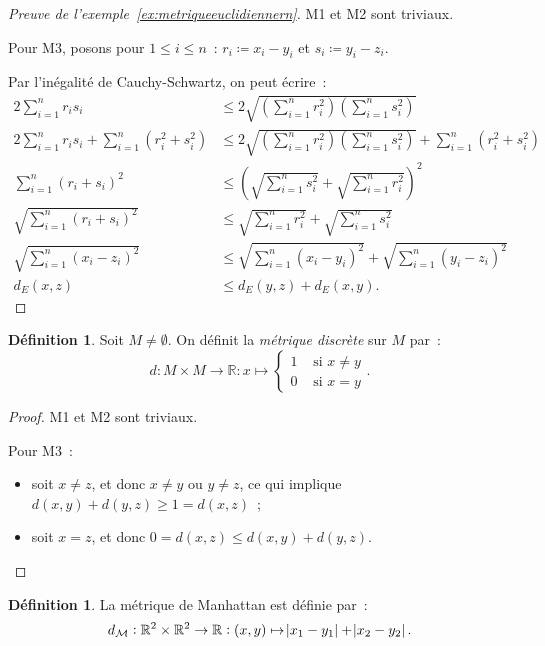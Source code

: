 \documentclass{report}
\theoremstyle{definition}
\newtheorem{déf}[thm]{Définition}
\theoremstyle{remark}
\newcommand{\R}{\mathbb R}
\begin{document}
		\begin{proof}[Preuve de l'exemple~\ref{ex:metriqueeuclidiennern}] M1 et M2 sont triviaux.

		Pour M3, posons pour $1 \leq i \leq n$~: $r_i \coloneqq x_i - y_i$ et $s_i \coloneqq y_i - z_i$.

		Par l'inégalité de Cauchy-Schwartz, on peut écrire~:
		\begin{align*}
			2\sum_{i=1}^nr_is_i &\leq 2\sqrt {\left(\sum_{i=1}^nr_i^2\right)\left(\sum_{i=1}^ns_i^2\right)} \\
			2\sum_{i=1}^nr_is_i + \sum_{i=1}^n(r_i^2+s_i^2) &\leq 2\sqrt{\left(\sum_{i=1}^nr_i^2\right)\left(\sum_{i=1}^ns_i^2\right)} + \sum_{i=1}^n(r_i^2+s_i^2) \\
			\sum_{i=1}^n(r_i+s_i)^2 &\leq \left(\sqrt {\sum_{i=1}^ns_i^2} + \sqrt {\sum_{i=1}^nr_i^2}\right)^2 \\
			\sqrt {\sum_{i=1}^n(r_i+s_i)^2} &\leq \sqrt {\sum_{i=1}^nr_i^2} + \sqrt {\sum_{i=1}^ns_i^2} \\
			\sqrt {\sum_{i=1}^n(x_i-z_i)^2} &\leq \sqrt {\sum_{i=1}^n(x_i-y_i)^2} + \sqrt {\sum_{i=1}^n(y_i-z_i)^2} \\
			d_E(x, z) &\leq d_E(y, z) + d_E(x, y).
		\end{align*}
		\end{proof}

		\begin{déf} Soit $M \neq \emptyset$. On définit la \textit{métrique discrète} sur $M$ par~:
		\[d : M \times M \to \R : x \mapsto \begin{cases} 1 &\text{ si } x \neq y \\ 0 &\text{ si } x = y \end{cases}.\]
		\end{déf}

		\begin{proof} M1 et M2 sont triviaux.

		Pour M3~:
		\begin{itemize}
			\item soit $x \neq z$, et donc $x \neq y$ ou $y \neq z$, ce qui implique $d(x, y) + d(y, z) \geq 1 = d(x, z)$~;
			\item soit $x = z$, et donc $0 = d(x, z) \leq d(x, y) + d(y, z)$.
		\end{itemize}
		\end{proof}

		\begin{déf} La métrique de Manhattan est définie par~:
		\[d_{\mathcal M} : \R^2 \times \R^2 \to \R : (x, y) \mapsto \abs {x_1 - y_1} + \abs {x_2 - y_2}.\]
		\end{déf}
\end{document}
